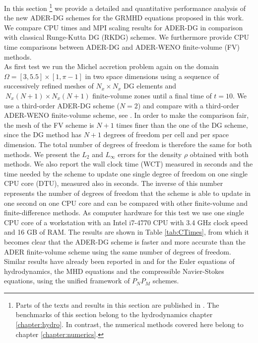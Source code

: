 %
In this section \footnote{
  Parts of the texts and results in this section are published in
  \cite{Fambri2018}. The benchmarks of this section belong to the hydrodynamics
  chapter \ref{chapter:hydro}. In contrast, the numerical methods covered here
  belong to chapter \ref{chapter:numerics}.
} we provide a detailed and quantitative performance analysis of 
the new ADER-DG schemes for the GRMHD equations proposed in this work. 
We compare CPU times and MPI scaling results for ADER-DG in comparison with 
classical Runge-Kutta DG (RKDG) schemes. We furthermore provide CPU time 
comparisons between ADER-DG and ADER-WENO finite-volume (FV) methods. \\
%
As first test we run the Michel accretion problem again on the domain 
$\Omega=[3,5.5] \times [1,\pi-1]$ in two space dimensions using a sequence 
of successively refined meshes of $N_x \times N_x$ DG elements and 
$\ N_x (N+1) \times N_x (N+1)$ finite-volume 
zones until a final time of $t=10$. 
We use a third-order ADER-DG scheme ($N=2$) and compare with 
a third-order ADER-WENO finite-volume scheme, see \cite{AMR3DCL,Dumbser2008}. 
In order to make the comparison 
fair, the mesh of the FV scheme is $N+1$ times finer than the one of the DG scheme, 
since the DG method has $N+1$ degrees of freedom per cell and per space dimension. 
The total number of degrees of freedom is therefore the same for both methods. 
We present the $L_2$ and $L_\infty$ errors for the density $\rho$    
obtained with both methods. We also report the wall clock time (WCT) measured in 
seconds and the time needed by the scheme to update one single degree 
of freedom on one single CPU core (DTU), measured also in seconds. The inverse  
of this number represents the number of degrees of freedom that the scheme is 
able to update in one second on one CPU core and can be compared with other 
finite-volume and finite-difference methods. 
As computer hardware for this test we use one single 
CPU core of a workstation with an Intel i7-4770 CPU with 3.4 GHz clock speed 
and 16 GB of RAM. The results are shown in Table \ref{tab:CTimes}, from which
it becomes clear that the ADER-DG scheme is faster and more accurate than the 
ADER finite-volume scheme using the same number of degrees of freedom. Similar 
results have already been reported in \cite{Dumbser2008} and \cite{ADERNSE} for 
the Euler equations of hydrodynamics, the MHD equations and the compressible 
Navier-Stokes equations, using the unified framework of $P_NP_M$ schemes. 
%

